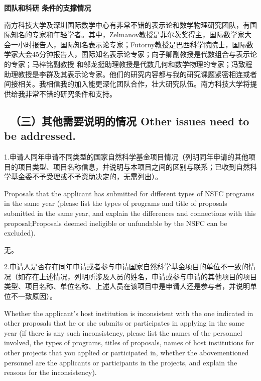 \documentclass[12pt,UTF8,AutoFakeBold=4,a4paper]{ctexart}
\begin{document}
\medskip

\textbf{\sihao 团队和科研 条件的支撑情况}

南方科技大学及深圳国际数学中心有非常不错的表示论和数学物理研究团队，有国际知名的专家和年轻学者。其中，Zelmanov教授是菲尔茨奖得主，国际数学家大会一小时报告人，国际知名表示论专家；Futorny教授是巴西科学院院士，国际数学家大会45分钟报告人，国际知名表示论专家；向子卿副教授是代数组合与表示论的专家；马梓铭副教授 和邬龙挺助理教授是代数几何和数学物理的专家；冯致程助理教授是李群及其表示论专家。他们的研究内容都与我的研究课题紧密相连或者间接相关。我相信我的加入能更深化团队合作，壮大研究队伍。南方科技大学将提供给我非常不错的研究条件和支持。

\bigskip

{\color{MsBlue} \subsection{\sihao \kaishu \qquad \ \bfseries（三）其他需要说明的情况 
\xiaosihao {} Other issues need to be addressed.}}
%

\bigskip

{\sihao \color{MsBlue} \kaishu 1.申请人同年申请不同类型的国家自然科学基金项目情况（列明同年申请的其他项目的项目类型、项目名称信息，并说明与本项目之间的区别与联系；已收到自然科学基金委不予受理或不予资助决定的，无需列出）。}

\bigskip

{\color{MsBlue} \xiaosihao {} 
Proposals that the applicant has submitted for different types of NSFC programs in the same year (please list the types of programs and title of proposals submitted in the same year, and explain the differences and connections with this proposal;Proposals deemed ineligible or unfundable by the NSFC can be excluded).}

\bigskip

无。

\bigskip

{\sihao \color{MsBlue} \kaishu 2.申请人是否存在同年申请或者参与申请国家自然科学基金项目的单位不一致的情况（如存在上述情况，列明所涉及人员的姓名，申请或参与申请的其他项目的项目类型、项目名称、单位名称、上述人员在该项目中是申请人还是参与者，并说明单位不一致原因）。}

\bigskip

{\color{MsBlue} \xiaosihao {} 
Whether the applicant's host institution is inconsistent with the one indicated in other proposals that he or she submits or participates in applying in the same year (if there is any such inconsistency, please list the names of the personnel involved, the types of programs, titles of proposals, names of host institutions for other projects that you applied or participated in, whether the abovementioned personnel are the applicants or participants in the projects, and explain the reasons for the inconsistency).}
\end{document}
